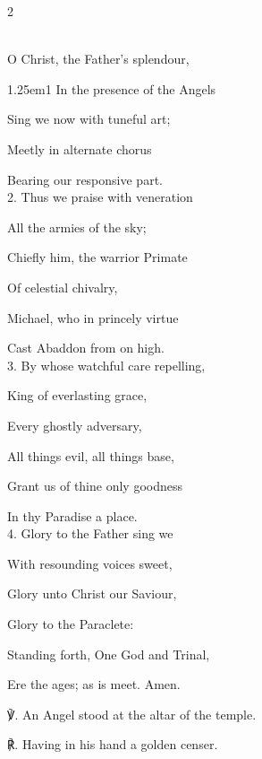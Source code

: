 \begin{paracol}{2}
\sloppy

\firstEvensong
{}\\%

\firstEvensongHymn
{} O Christ, the Father's splendour,


\begin{hangparas}{1.25em}{1}
In the presence of the Angels

Sing we now with tuneful art;

Meetly in alternate chorus

Bearing our responsive part.\\

2. Thus we praise with veneration

All the armies of the sky;

Chiefly him, the warrior Primate

Of celestial chivalry,

Michael, who in princely virtue

Cast Abaddon from on high.\\

3. By whose watchful care repelling,

King of everlasting grace,

Every ghostly adversary,

All things evil, all things base,

Grant us of thine only goodness

In thy Paradise a place.\\

4. Glory to the Father sing we

With resounding voices sweet,

Glory unto Christ our Saviour,

Glory to the Paraclete:

Standing forth, One God and Trinal,

Ere the ages; as is meet. Amen.\\
\end{hangparas}

℣. An Angel stood at the altar of the temple.

℟. Having in his hand a golden censer.




\end{paracol}
